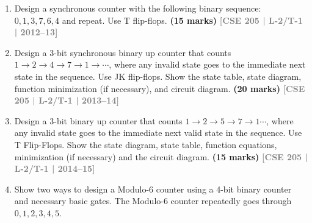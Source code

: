 \documentclass[12pt,a4paper]{article}
\newcommand{\yr}[1]{\hfill\textcolor{gray}{\small\textbf{[#1]}}}
\newcommand{\mk}[1]{\textcolor{orange!70!black}{\small\textbf{(#1 marks)}}}
\begin{document}
\begin{enumerate}

\item Design a synchronous counter with the following binary sequence: $0, 1, 3, 7, 6, 4$ and repeat. Use T flip-flops.
\mk{15} \yr{CSE 205 | L-2/T-1 | 2012--13}

\item Design a 3-bit synchronous binary up counter that counts $1 \to 2 \to 4 \to 7 \to 1 \to \cdots$, where any invalid state goes to the immediate next state in the sequence. Use JK flip-flops. Show the state table, state diagram, function minimization (if necessary), and circuit diagram.
\mk{20} \yr{CSE 205 | L-2/T-1 | 2013--14}


\item Design a 3-bit binary up counter that counts $1 \to 2 \to 5 \to 7 \to 1\cdots$, where any invalid state goes to the immediate next valid state in the sequence. Use T Flip-Flops. Show the state diagram, state table, function equations, minimization (if necessary) and the circuit diagram.
\mk{15} \yr{CSE 205 | L-2/T-1 | 2014--15}


\item Show two ways to design a Modulo-6 counter using a 4-bit binary counter and necessary basic gates. The Modulo-6 counter repeatedly goes through $0, 1, 2, 3, 4, 5$.

\begin{center}
\end{center}
\end{enumerate}
\end{document}
